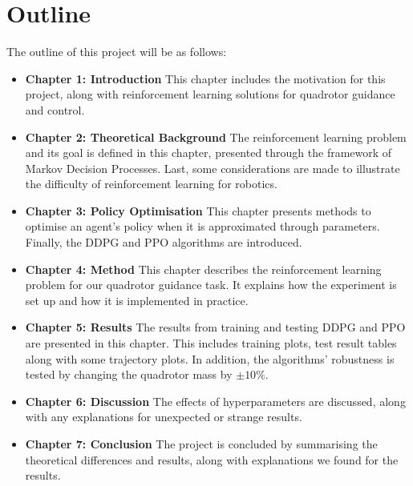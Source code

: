 \section{Outline}

The outline of this project will be as follows:
\vspace{2mm}
\begin{itemize}
    \item \textbf{Chapter 1: Introduction} This chapter includes the motivation for this project, along with reinforcement learning solutions for quadrotor guidance and control.
    \item \textbf{Chapter 2: Theoretical Background} The reinforcement learning problem and its goal is defined in this chapter, presented through the framework of Markov Decision Processes. Last, some considerations are made to illustrate the difficulty of reinforcement learning for robotics.
    \item \textbf{Chapter 3: Policy Optimisation} This chapter presents methods to optimise an agent's policy when it is approximated through parameters. Finally, the DDPG and PPO algorithms are introduced.
    \item \textbf{Chapter 4: Method} This chapter describes the reinforcement learning problem for our quadrotor guidance task. It explains how the experiment is set up and how it is implemented in practice.
    \item \textbf{Chapter 5: Results} The results from training and testing DDPG and PPO are presented in this chapter. This includes training plots, test result tables along with some trajectory plots. In addition, the algorithms' robustness is tested by changing the quadrotor mass by $\pm10\%$.
    \item \textbf{Chapter 6: Discussion} The effects of hyperparameters are discussed, along with any explanations for unexpected or strange results.
    \item \textbf{Chapter 7: Conclusion} The project is concluded by summarising the theoretical differences and results, along with explanations we found for the results.
\end{itemize}






















